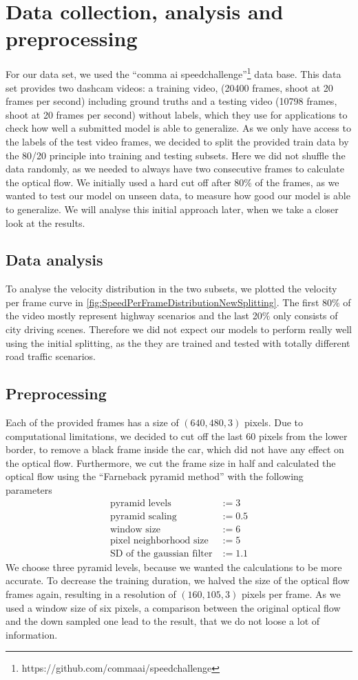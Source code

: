 \documentclass[conference]{IEEEtran}
\begin{document}
\section{Data collection, analysis and preprocessing}
For our data set, we used the \enquote{comma ai speedchallenge}\footnote{https://github.com/commaai/speedchallenge} data base. This data
set provides two dashcam videos: a training video, (20400 frames, shoot at 20 frames per second) including 
ground truths and a testing video (10798 frames, shoot at 20 frames per second) without labels, which they use for applications 
to check how well a submitted model is able to generalize.
As we only have access to the labels of the test video frames, we decided to split the provided train data by the 80/20 principle into 
training and testing subsets. Here we did not shuffle the data randomly, as we needed to always have two consecutive frames to 
calculate the optical flow. We initially used a hard cut off after 80$\%$ of the frames, as we wanted to test our model on unseen data, 
to measure how good our model is able to generalize. We will analyse this initial approach later, when we take a closer look
at the results.
\subsection{Data analysis}
To analyse the velocity distribution in the two subsets, we plotted the velocity per frame curve in 
\cref{fig:SpeedPerFrameDistributionNewSplitting}. The first 80$\%$ of the video mostly represent highway scenarios 
and the last 20$\%$ only consists of city driving scenes. 
Therefore we did not expect our models to perform really well using the initial splitting, as the they are trained and 
tested with totally different road traffic scenarios.

\subsection{Preprocessing}
Each of the provided frames has a size of $(640,480,3)$ pixels. Due to computational limitations, we decided to cut off the last 60 pixels from the lower border, to remove a black frame inside the car, which did not have any effect on the optical flow. Furthermore, we cut the frame size in half and calculated the optical flow using the \enquote{Farneback pyramid method} \cite{Farneback2003} with the following parameters
\begin{align*}
\text{pyramid levels} &:= 3\\
\text{pyramid scaling} &:= 0.5\\
\text{window size} &:= 6\\
\text{pixel neighborhood size} &:= 5\\
\text{SD of the gaussian filter} &:= 1.1
\end{align*}
We choose three pyramid levels, because we wanted the calculations to be more accurate. To decrease the training duration, we halved 
the size of the optical flow frames again, resulting in a resolution of
$(160,105,3)$ pixels per frame. As we used a window size of six pixels, a comparison between the original optical flow and the down 
sampled one lead to the result, that we do not loose a lot of information.
\end{document}

